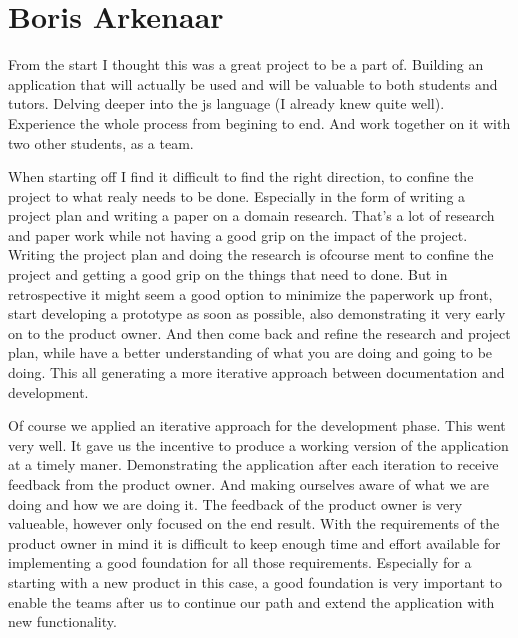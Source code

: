 
\section{Boris Arkenaar}
From the start I thought this was a great project to be a part of.
Building an application that will actually be used
and will be valuable to both \glspl{student} and \glspl{tutor}.
Delving deeper into the \gls{js} language (I already knew quite well).
Experience the whole process from begining to end.
And work together on it with two other students, as a team.

When starting off I find it difficult to find the right direction,
to confine the project to what realy needs to be done.
Especially in the form of writing a project plan
and writing a paper on a domain research.
That's a lot of research and paper work
while not having a good grip on the impact of the project.
Writing the project plan and doing the research
is ofcourse ment to confine the project
and getting a good grip on the things that need to done.
But in retrospective it might seem a good option
to minimize the paperwork up front,
start developing a prototype as soon as possible,
also demonstrating it very early on to the product owner.
And then come back and refine the research and project plan,
while have a better understanding of what you are doing
and going to be doing.
This all generating a more iterative approach
between documentation and development.

Of course we applied an iterative approach for the development phase.
This went very well.
It gave us the incentive to produce a working version of the application
at a timely maner.
Demonstrating the application after each iteration
to receive feedback from the product owner.
And making ourselves aware of what we are doing
and how we are doing it.
The feedback of the product owner is very valueable,
however only focused on the end result.
With the requirements of the product owner in mind
it is difficult to keep enough time and effort available
for implementing a good foundation for all those requirements.
Especially for a starting with a new product in this case,
a good foundation is very important
to enable the teams after us to continue our path
and extend the application with new functionality.

